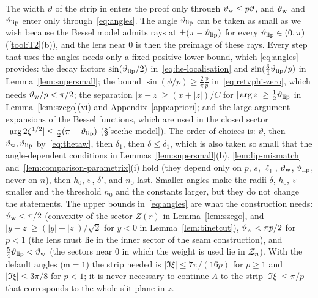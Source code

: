 \begin{remark}\label{rem:angles}
The width $\vartheta$ of the strip in \Ath{\vartheta} enters the proof only through $\vartheta_{\mathrm{w}}\le p\vartheta$, and $\vartheta_{\mathrm{w}}$ and
$\vartheta_{\mathrm{lip}}$ enter only through~\eqref{eq:angles}. The angle $\vartheta_{\mathrm{lip}}$ can be taken as small as we wish because the Bessel
model admits rays at $\pm(\pi-\vartheta_{\mathrm{lip}})$ for every $\vartheta_{\mathrm{lip}}\in(0,\pi)$ (\ref{tool:T2}(b)), and the lens near $0$ is then
the preimage of these rays. Every step that uses the angles needs only a fixed positive lower bound, which
\eqref{eq:angles} provides: the decay factors $\sin(\vartheta_{\mathrm{lip}}/2)$ in~\eqref{eq:he-localisation} and
$\sin(\frac34\vartheta_{\mathrm{lip}}/p)$ in Lemma~\ref{lem:supersmall}; the bound $\sin(\phi/p)\ge\frac2\pi\frac\phi p$
in~\eqref{eq:retvphi-zero}, which needs $\vartheta_{\mathrm{w}}/p<\pi/2$; the separation $|x-z|\ge(x+|z|)/C$ for $|\arg z|\ge\frac12\vartheta_{\mathrm{lip}}$
in Lemma~\ref{lem:szego}(vi) and Appendix~\ref{app:apriori}; and the large-argument expansions of the Bessel functions,
which are used in the closed sector $|\arg2\zeta^{1/2}|\le\frac12(\pi-\vartheta_{\mathrm{lip}})$ (\S\ref{sec:he-model}). The order of choices is: $\vartheta$, then $\vartheta_{\mathrm{w}},\vartheta_{\mathrm{lip}}$ by~\eqref{eq:thetaw}, then $\delta_1$, then $\delta\le\delta_1$, which is
also taken so small that the angle-dependent conditions in Lemmas~\ref{lem:supersmall}(b), \ref{lem:lip-mismatch}
and~\ref{lem:comparison-parametrix}(i) hold (they depend only on $p$, $s$, $\ell_1$, $\vartheta_{\mathrm{w}}$, $\vartheta_{\mathrm{lip}}$, never on $n$), then
$h_0$, $\varepsilon$, $\delta'$, and $n_0$ last. Smaller angles make
the radii $\delta$, $h_0$, $\varepsilon$ smaller and the threshold $n_0$ and the constants larger, but they do not change the
statements. The upper bounds in~\eqref{eq:angles} are what the construction needs: $\vartheta_{\mathrm{w}}<\pi/2$ (convexity of the
sector $Z(r)$ in Lemma~\ref{lem:szego}, and $|y-z|\ge(|y|+|z|)/\sqrt2$ for $y<0$ in Lemma~\ref{lem:binetcut}),
$\vartheta_{\mathrm{w}}<\pi p/2$ for $p<1$ (the lens must lie in the inner sector of the seam construction), and $\frac54\vartheta_{\mathrm{lip}}<\vartheta_{\mathrm{w}}$ (the
sectors near $0$ in which the weight is used lie in $\mathcal{Z}_n$). With the default angles ($\mathsf m=1$) the strip needed is
$|\Im\xi|\le7\pi/(16p)$ for $p\ge1$ and $|\Im\xi|\le3\pi/8$ for $p<1$; it is never necessary to continue $\Lambda$ to the
strip $|\Im\xi|\le\pi/p$ that corresponds to the whole slit plane in $z$.
\end{remark}

